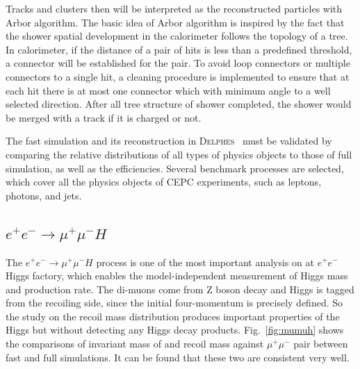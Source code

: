 \documentclass[a4paper,10pt,twoside]{cpc-hepnp}
\begin{document}
\begin{multicols}{2}
Tracks and clusters then will be interpreted as the reconstructed particles with Arbor algorithm\cite{ref:arbor}.
The basic idea of Arbor algorithm is inspired by the fact that the shower spatial development  in the calorimeter follows the topology of a tree.
In calorimeter, if the distance of a pair of hits is less than a predefined threshold, a connector will be established for the pair.
To avoid loop connectors or multiple connectors to a single hit,
a cleaning procedure is implemented to ensure that at each hit there is at most one connector which with minimum angle
to a well selected direction.
After all tree structure of shower completed, the shower would be merged with a track if it is charged or not.


The fast simulation and its reconstruction in {\textsc{Delphes}~} must be validated by comparing the relative distributions
of all types of physics objects to those of full simulation, as well as the efficiencies.
Several benchmark processes are selected, which cover all the physics objects of CEPC experiments, such as leptons, photons, and jets.


\subsection{$e^+e^-\to \mu^+\mu^-H$}

The $e^+e^- \to \mu^+\mu^-H$ process is one of the most important analysis on at $e^+e^-$ Higgs factory,
which enables the model-independent measurement of Higgs mass and production rate.
The di-muons come from Z boson decay and Higgs is tagged from the recoiling side, since the initial four-momentum is precisely defined.
So the study on the recoil mass distribution produces important properties of the Higgs but without detecting any Higgs decay products.
Fig.~\ref{fig:mumuh} shows the comparisons of invariant mass of and recoil mass against $\mu^+\mu^-$ pair between fast and full simulations.
It can be found that these two are consistent very well.


\end{multicols}
\end{document}

